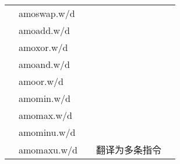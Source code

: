 \begin{longtable}{lllll}
                               & amoswap.w/d                      &                              &                                \\
                               & amoadd.w/d                       &                              &                                \\
                               & amoxor.w/d                       &                              &                                \\
                               & amoand.w/d                       &                              &                                \\
                               & amoor.w/d                        &                              &                                \\
                               & amomin.w/d                       &                              &                                \\
                               & amomax.w/d                       &                              &                                \\
                               & amominu.w/d                      &                              &                                \\
    \multirow{-9}{*}{}         & amomaxu.w/d                      & \multirow{-9}{*}{}           & \multirow{-9}{*}{翻译为多条指令}      \\

\end{longtable}
